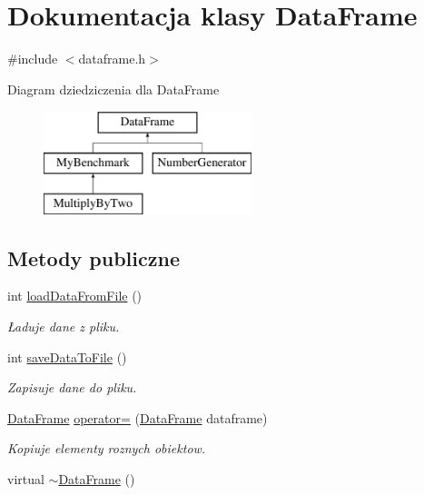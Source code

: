 \hypertarget{class_data_frame}{\section{Dokumentacja klasy Data\-Frame}
\label{class_data_frame}
}


{\ttfamily \#include $<$dataframe.\-h$>$}

Diagram dziedziczenia dla Data\-Frame\begin{figure}[H]
\begin{center}
\leavevmode
\includegraphics[height=3.000000cm]{class_data_frame}
\end{center}
\end{figure}
\subsection*{Metody publiczne}
\begin{DoxyCompactItemize}
\item 
int \hyperlink{class_data_frame_a617ef21804065f31115c01527155f499}{load\-Data\-From\-File} ()
\begin{DoxyCompactList}\small\item\em Ładuje dane z pliku. \end{DoxyCompactList}\item 
int \hyperlink{class_data_frame_a03cc3ac606fdb8a2dbcaea5d429cf208}{save\-Data\-To\-File} ()
\begin{DoxyCompactList}\small\item\em Zapisuje dane do pliku. \end{DoxyCompactList}\item 
\hyperlink{class_data_frame}{Data\-Frame} \hyperlink{class_data_frame_ab7dddb09f5ee9dc4a5783136dad01962}{operator=} (\hyperlink{class_data_frame}{Data\-Frame} dataframe)
\begin{DoxyCompactList}\small\item\em Kopiuje elementy roznych obiektow. \end{DoxyCompactList}\item 
virtual \hyperlink{class_data_frame_a1360ddf00d717392fe1292bc1e1990ff}{$\sim$\-Data\-Frame} ()
\end{DoxyCompactItemize}
